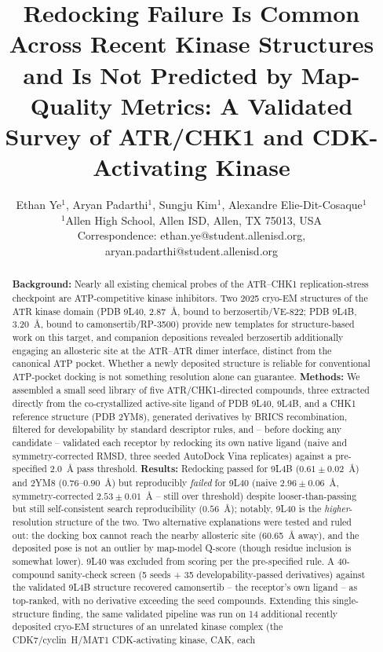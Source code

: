 \documentclass[11pt]{article}
\title{\Large Redocking Failure Is Common Across Recent Kinase Structures and Is Not Predicted by Map-Quality Metrics: A Validated Survey of ATR/CHK1 and CDK-Activating Kinase}
\author{Ethan Ye$^{1}$, Aryan Padarthi$^{1}$, Sungju Kim$^{1}$, Alexandre Elie-Dit-Cosaque$^{1}$\\[4pt]
\small $^{1}$Allen High School, Allen ISD, Allen, TX 75013, USA\\[2pt]
\small Correspondence: ethan.ye@student.allenisd.org, aryan.padarthi@student.allenisd.org}
\date{}
\begin{document}
\maketitle

\begin{abstract}
\noindent
\textbf{Background:} Nearly all existing chemical probes of the ATR--CHK1
replication-stress checkpoint are ATP-competitive kinase inhibitors. Two
2025 cryo-EM structures of the ATR kinase domain (PDB 9L40, 2.87~{\AA},
bound to berzosertib/VE-822; PDB 9L4B, 3.20~{\AA}, bound to
camonsertib/RP-3500) provide new templates for structure-based work on this
target, and companion depositions revealed berzosertib additionally
engaging an allosteric site at the ATR--ATR dimer interface, distinct from
the canonical ATP pocket. Whether a newly deposited structure is reliable
for conventional ATP-pocket docking is not something resolution alone can
guarantee. \textbf{Methods:} We assembled a small seed library of five
ATR/CHK1-directed compounds, three extracted directly from the
co-crystallized active-site ligand of PDB 9L40, 9L4B, and a CHK1 reference
structure (PDB 2YM8), generated derivatives by BRICS recombination,
filtered for developability by standard descriptor rules, and -- before
docking any candidate -- validated each receptor by redocking its own
native ligand (naive and symmetry-corrected RMSD, three seeded AutoDock
Vina replicates) against a pre-specified 2.0~{\AA} pass threshold.
\textbf{Results:} Redocking passed for 9L4B ($0.61\pm0.02$~{\AA}) and 2YM8
($0.76$--$0.90$~{\AA}) but reproducibly \emph{failed} for 9L40 (naive
$2.96\pm0.06$~{\AA}, symmetry-corrected $2.53\pm0.01$~{\AA} -- still over
threshold) despite looser-than-passing but still self-consistent search
reproducibility ($0.56$~{\AA}); notably, 9L40 is the \emph{higher}-resolution
structure of the two. Two alternative explanations were tested and ruled
out: the docking box cannot reach the nearby allosteric site
(60.65~{\AA} away), and the deposited pose is not an outlier by map-model
Q-score (though residue inclusion is somewhat lower). 9L40 was excluded
from scoring per the pre-specified rule. A 40-compound sanity-check screen
(5 seeds + 35 developability-passed derivatives) against the validated
9L4B structure recovered camonsertib -- the receptor's own ligand -- as
top-ranked, with no derivative exceeding the seed compounds.
Extending this single-structure finding, the same validated pipeline was
run on 14 additional recently deposited cryo-EM structures of an unrelated
kinase complex (the CDK7/cyclin~H/MAT1 CDK-activating kinase, CAK, each

\end{abstract}
\end{document}
